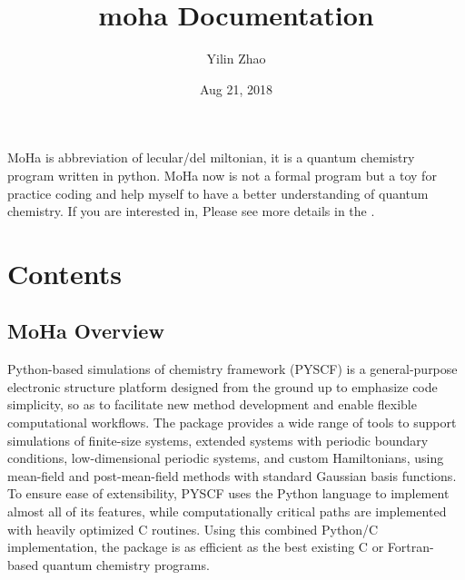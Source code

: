 \documentclass[letterpaper,10pt,english]{sphinxmanual}
\title{moha Documentation}
\date{Aug 21, 2018}
\author{Yilin Zhao}
\begin{document}
\maketitle
\sphinxtableofcontents
{}\label{\detokenize{index::doc}}


MoHa is abbreviation of lecular/del miltonian, it is a quantum chemistry program written in python. MoHa now is not a formal program but a toy for practice coding and help myself to have a better
understanding of quantum chemistry. If you are interested in, Please see more details in the .


\chapter{Contents}
\label{\detokenize{index:contents}}

\section{MoHa Overview}
\label{\detokenize{overview:moha-overview}}\label{\detokenize{overview:overview-rst}}\label{\detokenize{overview::doc}}
Python-based simulations of chemistry framework (PYSCF) is a general-purpose
electronic structure platform designed from the ground up to emphasize code
simplicity, so as to facilitate new method development and enable flexible
computational workflows. The package provides a wide range of tools to support
simulations of finite-size systems, extended systems with periodic boundary
conditions, low-dimensional periodic systems, and custom Hamiltonians, using
mean-field and post-mean-field methods with standard Gaussian basis functions.
To ensure ease of extensibility, PYSCF uses the Python language to implement
almost all of its features, while computationally critical paths are
implemented with heavily optimized C routines. Using this combined Python/C
implementation, the package is as efficient as the best existing C or Fortran-
based quantum chemistry programs.
\end{document}
